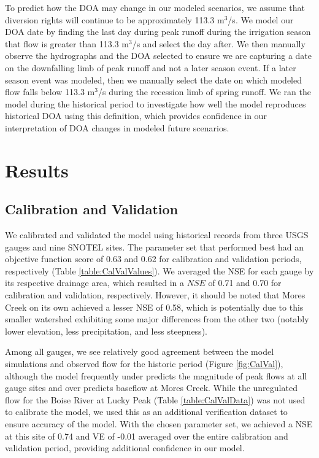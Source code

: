 \documentclass[11pt,letterpaper]{article}
\begin{document}
To predict how the DOA may change in our modeled scenarios, we assume that diversion rights will continue to be approximately 113.3 m${}^3$/s. We model our DOA date by finding the last day during peak runoff during the irrigation season that flow is greater than 113.3 m${}^3$/s and select the day after. We then manually observe the hydrographs and the DOA selected to ensure we are capturing a date on the downfalling limb of peak runoff and not a later season event. If a later season event was modeled, then we manually select the date on which modeled flow falls below 113.3 m${}^3$/s during the recession limb of spring runoff. We ran the model during the historical period to investigate how well the model reproduces historical DOA using this definition, which provides confidence in our interpretation of DOA changes in modeled future scenarios.

\section{Results}

\subsection{Calibration and Validation}
We calibrated and validated the model using historical records from three USGS gauges and nine SNOTEL sites. The parameter set that performed best had an objective function score of 0.63 and 0.62 for calibration and validation periods, respectively (Table \ref{table:CalValValues}). We averaged the NSE for each gauge by its respective drainage area, which resulted in a $NSE$ of 0.71 and 0.70 for calibration and validation, respectively. However, it should be noted that Mores Creek on its own achieved a lesser NSE of 0.58, which is potentially due to this smaller watershed exhibiting some major differences from the other two (notably lower elevation, less precipitation, and less steepness).

Among all gauges, we see relatively good agreement between the model simulations and observed flow for the historic period (Figure \ref{fig:CalVal}), although the model frequently under predicts the magnitude of peak flows at all gauge sites and over predicts baseflow at Mores Creek. While the unregulated flow for the Boise River at Lucky Peak (Table \ref{table:CalValData}) was not used to calibrate the model, we used this as an additional verification dataset to ensure accuracy of the model. With the chosen parameter set, we achieved a NSE at this site of 0.74 and VE of -0.01 averaged over the entire calibration and validation period, providing additional confidence in our model.
\end{document}
